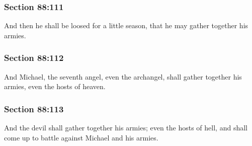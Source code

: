 
	\subsubsection{Section 88:111} %
		\label{DC88-111}

		And then he shall be loosed for a little season, that he may gather together his armies.


	\subsubsection{Section 88:112} %
		\label{DC88-112}

		And Michael, the seventh angel, even the archangel, shall gather together his armies, even the hosts of heaven.


	\subsubsection{Section 88:113} %
		\label{DC88-113}

		And the devil shall gather together his armies; even the hosts of hell, and shall come up to battle against Michael and his armies.

